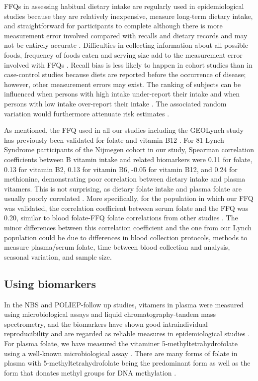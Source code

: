 \noindent FFQs in assessing habitual dietary intake are regularly used in epidemiological studies because they are relatively inexpensive, measure long-term dietary intake, and straightforward for participants to complete \cite{c724} although there is more measurement error involved compared with recalls and dietary records and may not be entirely accurate \cite{c725,c726}. Difficulties in collecting information about all possible foods, frequency of foods eaten and serving size add to the measurement error involved with FFQs \cite{c727}. Recall bias is less likely to happen in cohort studies than in case-control studies because diets are reported before the occurrence of disease; however, other measurement errors may exist. The ranking of subjects can be influenced when persons with high intake under-report their intake and when persons with low intake over-report their intake \cite{c728}. The associated random variation would furthermore attenuate risk estimates \cite{c729}.

\noindent As mentioned, the FFQ used in all our studies including the GEOLynch study has previously been validated for folate and vitamin B12 \cite{c717}. For 81 Lynch Syndrome participants of the Nijmegen cohort in our study, Spearman correlation coefficients between B vitamin intake and related biomarkers were 0.11 for folate, 0.13 for vitamin B2, 0.13 for vitamin B6, -0.05 for vitamin B12, and 0.24 for methionine, demonstrating poor correlation between dietary intake and plasma vitamers. This is not surprising, as dietary folate intake and plasma folate are usually poorly correlated \cite{c722,c730,c731}. More specifically, for the population in which our FFQ was validated, the correlation coefficient between serum folate and the FFQ was 0.20, similar to blood folate-FFQ folate correlations from other studies \cite{c722,c730,c731}. The minor differences between this correlation coefficient and the one from our Lynch population could be due to differences in blood collection protocols, methods to measure plasma/serum folate, time between blood collection and analysis, seasonal variation, and sample size.

\subsection{Using biomarkers} %
\noindent In the NBS and POLIEP-follow up studies, vitamers in plasma were measured using microbiological assays and liquid chromatography-tandem mass spectrometry, and the biomarkers have shown good intraindividual reproducibility and are regarded as reliable measures in epidemiological studies \cite{c732}. For plasma folate, we have measured the vitaminer 5-methyltetrahydrofolate using a well-known microbiological assay \cite{c733}. There are many forms of folate in plasma with 5-methyltetrahydrofolate being the predominant form as well as the form that donates methyl groups for DNA methylation \cite{c734}.

